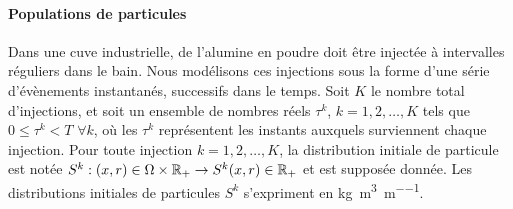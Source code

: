 \paragraph{Populations de particules}
Dans une cuve industrielle, de l'alumine en poudre doit être injectée
à intervalles réguliers dans le bain. Nous modélisons ces injections
sous la forme d'une série d'évènements instantanés, successifs dans le
temps. Soit $K$ le nombre total d'injections, et soit un ensemble de
nombres réels $\tau^k$, $k = 1, 2, \dots, K$ tels que $0\leq \tau^k <
T$ $\forall k$, où les $\tau^k$ représentent les instants auxquels
surviennent chaque injection. Pour toute injection $k = 1,2, \dots,
K$, la distribution initiale de particule est notée $S^k:(x,
r)\in\Omega\times{\mathbb R_+}\to S^k(x, r)\in{\mathbb R_+}$ et est supposée
donnée. Les distributions initiales de particules $S^k$ s'expriment en
\si{\kilo\gram\per\cubic\meter\per\meter}.

